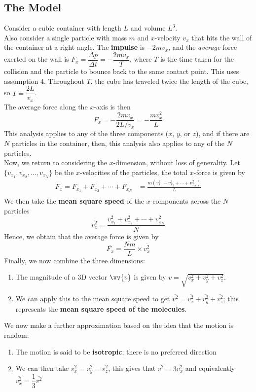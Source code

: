 \documentclass[a4paper,12pt]{article}
\newcommand{\lb}{\\[8pt]}
\newcommand{\assref}[1]{\textcolor{orange!100!black!90}{assumption #1}}
\begin{document}
\subsection{The Model}

Consider a cubic container with length $L$ and volume $L^3$.\lb
Also consider a single particle with mass $m$ and $x$-velocity $v_x$ that hits the wall of the container at a right angle. The \textbf{impulse} is $-2mv_x$, and the \textit{average} force exerted on the wall is $F_x = \dfrac{\Delta p}{\Delta t} = -\dfrac{2mv_x}{T}$, where $T$ is the time taken for the collision and the particle to bounce back to the same contact point. This uses \assref{4}. Throughout $T$, the cube has traveled twice the length of the cube, so $T = \dfrac{2L}{v_x}$.\lb
The average force along the $x$-axis is then $$F_x = -\frac{2mv_x}{2L/v_x} = -\frac{mv_x^2}{L}$$
This analysis applies to any of the three components ($x$, $y$, or $z$), and if there are $N$ particles in the container, then, this analysis also applies to any of the $N$ particles.\lb
Now, we return to considering the $x$-dimension, without loss of generality. Let $\{v_{x_1}, v_{x_2}, \dotsc, v_{x_N}\}$ be the $x$-velocities of the particles, the total $x$-force is given by
\begin{align*}
  F_x = F_{x_1} + F_{x_2} + \dotsb + F_{x_N} & = \frac{m(v_{x_1}^2 + v_{x_2}^2 + \dotsb + v_{x_N}^2)}{L} \\
\end{align*}
We then take the \textbf{mean square speed} of the $x$-components across the $N$ particles $$\overline{v_x^2} = \frac{v_{x_1}^2 + v_{x_2}^2 + \dotsb + v_{x_N}^2}{N}$$
Hence, we obtain that the average force is given by $$\overline{F_x} = \frac{Nm}{L}\times\overline{v_x^2}$$
Finally, we now combine the three dimensions:
\begin{enumerate}
  \item The magnitude of a 3D vector $\vv{v}$ is given by $v = \sqrt{v_x^2 + v_y^2 + v_z^2}$.
  \item We can apply this to the mean square speed to get $\overline{v^2} = \overline{v_x^2} + \overline{v_y^2} + \overline{v_z^2}$; this represents the \textbf{mean square speed of the molecules}.
\end{enumerate}
We now make a further approximation based on the idea that the motion is random:
\begin{enumerate}
  \item The motion is said to be \textbf{isotropic}; there is no preferred direction
  \item We can then take $v_x^2 = v_y^2 = v_z^2$, this gives that $\overline{v^2} = 3\overline{v^2_x}$ and equivalently $\overline{v^2_x} = \dfrac{1}{3}\overline{v^2}$
\end{enumerate}
\end{document}

